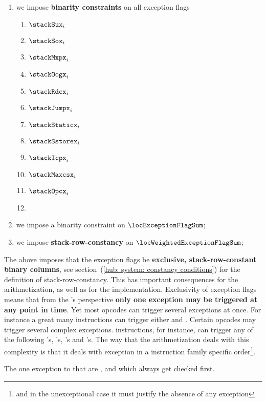 \begin{enumerate}
	\item we impose \textbf{binarity constraints} on all exception flags
		\begin{multicols}{4}
			\begin{enumerate}
				\item $\stackSux     _{i}$
				\item $\stackSox     _{i}$
				\item $\stackMxpx    _{i}$
				\item $\stackOogx    _{i}$
				\item $\stackRdcx    _{i}$
				\item $\stackJumpx   _{i}$
				\item $\stackStaticx _{i}$
				\item $\stackSstorex _{i}$
				\item $\stackIcpx    _{i}$
				\item $\stackMaxcsx  _{i}$
				\item $\stackOpcx    _{i}$
				\item[\vspace{\fill}]
			\end{enumerate}
		\end{multicols}
        \item we impose a binarity constraint on $\locExceptionFlagSum$;
	\item we impose \textbf{stack-row-constancy} on $\locWeightedExceptionFlagSum$;
\end{enumerate}

\saNote{} \label{hub: generalities: exceptions: the stack's exception are exclusive binary flags}
The above imposes that the exception flags be \textbf{exclusive, stack-row-constant binary columns}, see section~(\ref{hub: system: constancy conditions}) for the definition of stack-row-constancy.
This has important consequences for the arithmetization, as well as for the implementation.
Exclusivity of exception flags means that from the \zkEvm{}'s perspective \textbf{only one exception may be triggered at any point in time}.
Yet most \evm{} opcodes can trigger several exceptions at once.
For instance a great many instructions can trigger either \suxSH{} and \oogxSH{}.
Certain opcodes may trigger several complex exceptions.
 instructions, for instance, can trigger any of the following
\suxSH's,
\staticxSH's,
\mxpxSH's and
\oogxSH's.
The way that the arithmetization deals with this complexity is that it deals with exception in a instruction family specific order\footnote{and in the unexceptional case it must justify the absence of any exception}.

\saNote{} The one exception to that are \opcxSH{}, \suxSH{} and \soxSH{} which always get checked first.
